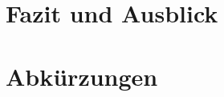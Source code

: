 \documentclass[conference,compsoc,final,a4paper]{IEEEtran}
\begin{document}


    \section{Fazit und Ausblick}


    \section*{Abkürzungen}

    \begin{acronym}[IEEE]
    \end{acronym}

    \AtNextBibliography{\small}
    \printbibliography
\end{document}
